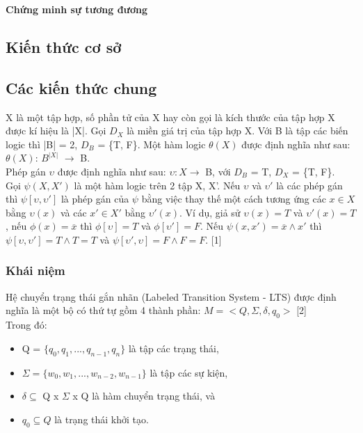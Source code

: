 \documentclass{article}
\begin{document}
	\begin{center}
		\textbf{\large Chứng minh sự tương đương}
	\end{center}
	\begin{flushleft}
		\section{Kiến thức cơ sở}
			\subsection{Các kiến thức chung}
			X là một tập hợp, số phần tử của X hay còn gọi là kích thước của tập hợp X được kí hiệu là |X|. Gọi $D_X$ là miền giá trị của tập hợp X. Với B là tập các biến logic thì |B| = 2, $D_B$ = \{T, F\}. Một hàm logic $\theta(X)$ được định nghĩa như sau: $\theta(X)$: $B^{|X|}$ $\to$ B.\\
			Phép gán $\upsilon$ được định nghĩa như sau: $\upsilon: X \to$ B, với $D_B$ = T, $D_X$ = \{T, F\}.\\
			Gọi $\psi(X, X')$ là một hàm logic trên 2 tập X, X'. Nếu $\upsilon$ và $\upsilon'$ là các phép gán thì $\psi[\upsilon, \upsilon']$ là phép gán của $\psi$ bằng việc thay thế một cách tương ứng các $x \in X$ bằng $\upsilon(x)$ và các $x' \in X'$ bằng $\upsilon'(x)$. Ví dụ, giả sử $\upsilon(x) = T$ và $\upsilon'(x) = T$, nếu $\phi(x) = \overline x$ thì $\phi [\upsilon] = T$ và $\phi[\upsilon'] = F$. Nếu $\psi(x, x') = \overline x \land x'$ thì $\psi[\upsilon, \upsilon'] = T \land T = T$ và $\psi[\upsilon', \upsilon] = F \land F = F$. [1]
			\subsubsection{Khái niệm}
				Hệ chuyển trạng thái gắn nhãn (Labeled Transition System - LTS) được định nghĩa là một bộ có thứ tự gồm 4 thành phần: $M = <Q, \Sigma, \delta, q_{0}>$ [2]\\
				Trong đó:\\
				\begin{itemize}
					\item Q = $\{q_{0}, q_{1}, ..., q_{n-1}, q_{n}\}$ là tập các trạng thái,
					\item $\Sigma = \{w_{0}, w_{1}, ..., w_{n-2}, w_{n-1}\}$ là tập các sự kiện,
					\item $\delta \subseteq$ Q x $\Sigma$ x Q là hàm chuyển trạng thái, và
					\item $q_{0} \subseteq Q$ là trạng thái khởi tạo.\\
				\end{itemize}
				

\end{flushleft}
\end{document}
